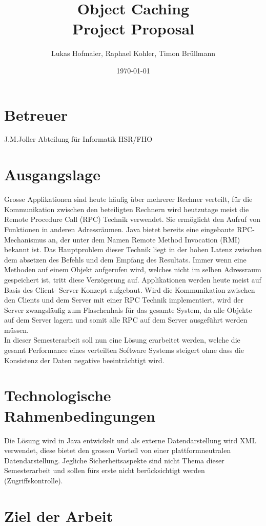 \documentclass{article}
\title{Object Caching\\Project Proposal}
\author{Lukas Hofmaier, Raphael Kohler, Timon Brüllmann}
\date{\today}
\begin{document}
\maketitle
\section{Betreuer}
J.M.Joller  Abteilung für Informatik HSR/FHO

\section{Ausgangslage}
Grosse Applikationen sind heute häufig über mehrerer Rechner verteilt, für die Kommunikation zwischen den beteiligten Rechnern wird heutzutage meist die Remote Procedure Call (RPC) Technik verwendet. Sie ermöglicht den Aufruf von Funktionen in anderen Adressräumen. Java bietet bereits eine eingebaute RPC- Mechanismus an, der unter dem Namen Remote Method Invocation (RMI) bekannt ist. 
Das Hauptproblem dieser Technik liegt in der hohen Latenz zwischen dem absetzen des Befehls und dem Empfang des Resultats. Immer wenn eine Methoden auf einem Objekt aufgerufen wird, welches nicht im selben Adressraum gespeichert ist, tritt diese Verzögerung auf.
Applikationen werden heute meist auf Basis des Client- Server Konzept aufgebaut. Wird die Kommunikation zwischen den Clients und dem Server mit einer RPC Technik implementiert,  wird der Server zwangsläufig zum  Flaschenhals für das gesamte System, da alle Objekte auf dem Server lagern und somit alle RPC auf dem Server ausgeführt werden müssen.\\
In dieser Semesterarbeit soll nun eine Lösung erarbeitet werden, welche die gesamt Performance eines verteilten Software Systems steigert ohne dass die Konsistenz der Daten negative beeinträchtigt wird.
\section{Technologische Rahmenbedingungen}
Die Lösung wird in Java entwickelt und als externe Datendarstellung wird XML verwendet, diese bietet den grossen Vorteil von einer plattformneutralen Datendarstellung. Jegliche Sicherheitsaspekte sind nicht Thema dieser Semesterarbeit und sollen fürs erste nicht berücksichtigt werden (Zugriffskontrolle).
\section{Ziel der Arbeit}
\end{document}

